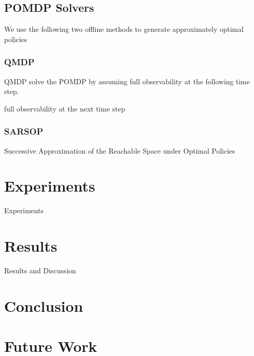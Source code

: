 \documentclass[conference]{IEEEtran}
\begin{document}
\subsection{POMDP Solvers}

We use the following two offline methods to generate approximately optimal policies

\subsubsection{QMDP}
QMDP solve the POMDP by assuming full observability at the following time step. \cite{Littman1995LearningUp}

full observability at the next time step

\subsubsection{SARSOP}
Successive Approximation of the Reachable Space under Optimal Policies 
\cite{Kurniawati2009SARSOP:Spaces}


\section{Experiments}
\label{sec:experiments}

Experiments

\section{Results}
\label{sec:results}


Results and Discussion

\section{Conclusion}
\label{sec:conclusion}



\section{Future Work}
\label{sec:future-work}




\end{document}
